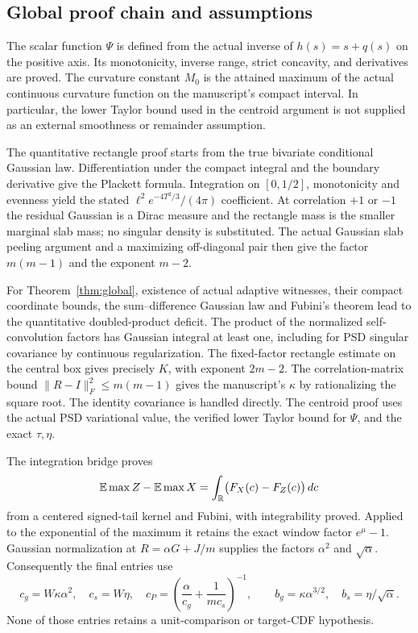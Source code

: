 \subsection{Global proof chain and assumptions}\label{lv:global}
The scalar function $\Psi$ is defined from the actual inverse of
$h(s)=s+q(s)$ on the positive axis.  Its monotonicity, inverse range,
strict concavity, and derivatives are proved.  The curvature constant
$M_0$ is the attained maximum of the actual continuous curvature
function on the manuscript's compact interval.  In particular,
the lower Taylor bound used in the centroid argument is not supplied
as an external smoothness or remainder assumption.

The quantitative rectangle proof starts from the true bivariate
conditional Gaussian law.  Differentiation under the compact integral
and the boundary derivative give the Plackett formula.  Integration
on $[0,1/2]$, monotonicity and evenness yield the stated
$\ell^2e^{-4T^2/3}/(4\pi)$ coefficient.  At correlation $+1$ or $-1$
the residual Gaussian is a Dirac measure and the rectangle mass is
the smaller marginal slab mass; no singular density is substituted.
The actual Gaussian slab peeling argument and a maximizing
off-diagonal pair then give the factor $m(m-1)$ and the exponent $m-2$.

For Theorem~\ref{thm:global}, existence of actual adaptive witnesses,
their compact coordinate bounds, the sum--difference Gaussian law
and Fubini's theorem lead to the quantitative doubled-product deficit.
The product of the normalized self-convolution factors has Gaussian
integral at least one, including
for PSD singular covariance by continuous regularization.
The fixed-factor rectangle estimate on the central box gives precisely
$K$, with exponent $2m-2$.  The correlation-matrix bound
$\|R-I\|_F^2\le m(m-1)$ gives the manuscript's $\kappa$ by
rationalizing the square root.  The identity covariance is handled
directly.  The centroid proof uses the actual PSD variational value,
the verified lower Taylor bound for $\Psi$, and the exact $\tau,\eta$.

The integration bridge proves
\[
 \mathbb E\max Z-\mathbb E\max X
 =\int_{\mathbb R}\bigl(F_X(c)-F_Z(c)\bigr)\,dc
\]
from a centered signed-tail kernel and Fubini, with integrability
proved.  Applied to the exponential of the maximum it retains the
exact window factor $e^\mu-1$.  Gaussian normalization at
$R=\alpha G+J/m$ supplies the factors $\alpha^2$ and $\sqrt\alpha$.
Consequently the final entries use
\[
 c_g=W\kappa\alpha^2,\quad c_s=W\eta,\quad
 c_P=\left(\frac{\alpha}{c_g}+\frac{1}{mc_s}\right)^{-1},
 \qquad b_g=\kappa\alpha^{3/2},\quad b_s=\eta/\sqrt\alpha.
\]
None of those entries retains a unit-comparison or target-CDF hypothesis.

